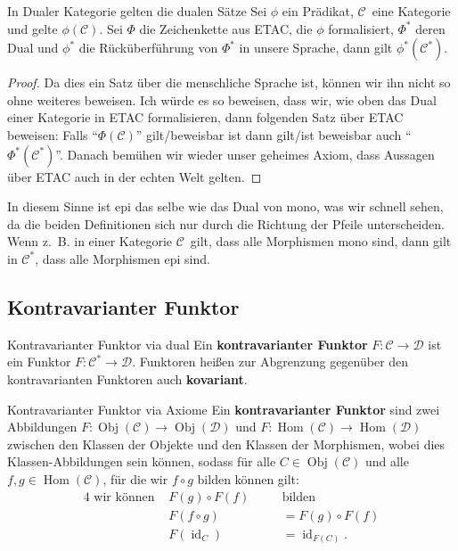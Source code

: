 \documentclass[a4paper]{amsart}
\theoremstyle{definition}
\DeclareMathOperator{\id}{id}
\DeclareMathOperator{\Hom}{Hom}
\DeclareMathOperator{\Obj}{Obj}
\newcommand{\CC}{\ensuremath{\mathcal{ C }}}
\newcommand{\DD}{\ensuremath{\mathcal{ D }}}
\newcommand{\zb}{z.~B. }
\begin{document}
\begin{Satz}{In Dualer Kategorie gelten die dualen Sätze}
   Sei $\phi$ ein Prädikat, \CC\ eine Kategorie und gelte $\phi(\CC)$. Sei $\Phi$ die Zeichenkette aus ETAC, die $\phi$ formalisiert, $\Phi^*$ deren Dual und $\phi^*$ die Rücküberführung von $\Phi^*$ in unsere Sprache, dann gilt $\phi^*(\CC^*)$.
\end{Satz}
\begin{proof}
   Da dies ein Satz über die menschliche Sprache ist, können wir ihn nicht so ohne weiteres beweisen. Ich würde es so beweisen, dass wir, wie oben das  Dual einer Kategorie in ETAC formalisieren, dann folgenden Satz über ETAC beweisen: Falls "`$\Phi(\CC)$"' gilt/beweisbar ist dann gilt/ist beweisbar auch "`$\Phi^*(\CC^*)$"'. Danach bemühen wir wieder unser geheimes Axiom, dass Aussagen über ETAC auch in der echten Welt gelten.
\end{proof}

In diesem Sinne ist epi das selbe wie das Dual von mono, was wir schnell sehen, da die beiden Definitionen sich nur durch die Richtung der Pfeile unterscheiden. Wenn \zb in einer Kategorie \CC\ gilt, dass alle Morphismen mono sind, dann gilt in $\CC^*$, dass alle Morphismen epi sind.

\subsection{Kontravarianter Funktor}
\begin{Definition}{Kontravarianter Funktor via dual}
   Ein \textbf{kontravarianter Funktor} $F \colon \CC \to \DD$ ist ein Funktor $F \colon \CC^* \to \DD$. Funktoren heißen zur Abgrenzung gegenüber den kontravarianten Funktoren auch \textbf{kovariant}.
\end{Definition}

\begin{Definition}{Kontravarianter Funktor via Axiome}
   Ein \textbf{kontravarianter Funktor} sind zwei Abbildungen $F \colon \Obj( \CC ) \to \Obj( \DD )$ und $F \colon \Hom( \CC ) \to \Hom( \DD )$ zwischen den Klassen der Objekte und den Klassen der Morphismen, wobei dies Klassen-Abbildungen sein können, sodass für alle $C \in \Obj(\CC)$ und alle $f, g \in \Hom( \CC )$, für die wir $f \circ g$ bilden können gilt:
   \begin{alignat}{4}
      \text{ wir können } &F(g) \circ F(f) \quad &&\text{bilden}\\
      &F( f \circ g ) &&= F(g) \circ F(f)\\
      &F( \id_C) &&= \id_{F(C)}.
   \end{alignat}
\end{Definition}
\end{document}
